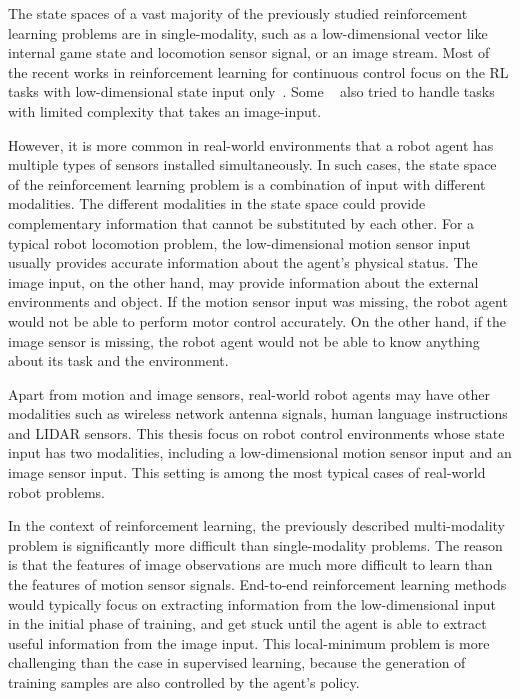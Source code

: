 The state spaces of a vast majority of the previously studied reinforcement learning problems are in single-modality, such as a low-dimensional vector like internal game state and locomotion sensor signal, or an image stream. Most of the recent works in reinforcement learning for continuous control focus on the RL tasks with low-dimensional state input only~\cite{duan2016benchmarking}. Some ~\cite{wu2017scalable} also tried to handle tasks with limited complexity that takes an image-input.

However, it is more common in real-world environments that a robot agent has multiple types of sensors installed simultaneously. In such cases, the state space of the reinforcement learning problem is a combination of input with different modalities. The different modalities in the state space could provide complementary information that cannot be substituted by each other. For a typical robot locomotion problem, the low-dimensional motion sensor input usually provides accurate information about the agent's physical status. The image input, on the other hand, may provide information about the external environments and object. If the motion sensor input was missing, the robot agent would not be able to perform motor control accurately. On the other hand, if the image sensor is missing, the robot agent would not be able to know anything about its task and the environment.


Apart from motion and image sensors, real-world robot agents may have other modalities such as wireless network antenna signals, human language instructions and LIDAR sensors. This thesis focus on robot control environments whose state input has two modalities, including a low-dimensional motion sensor input and an image sensor input. This setting is among the most typical cases of real-world robot problems.

In the context of reinforcement learning, the previously described multi-modality problem is significantly more difficult than single-modality problems. The reason is that the features of image observations are much more difficult to learn than the features of motion sensor signals. End-to-end reinforcement learning methods would typically focus on extracting information from the low-dimensional input in the initial phase of training, and get stuck until the agent is able to extract useful information from the image input. This local-minimum problem is more challenging than the case in supervised learning, because the generation of training samples are also controlled by the agent's policy.

